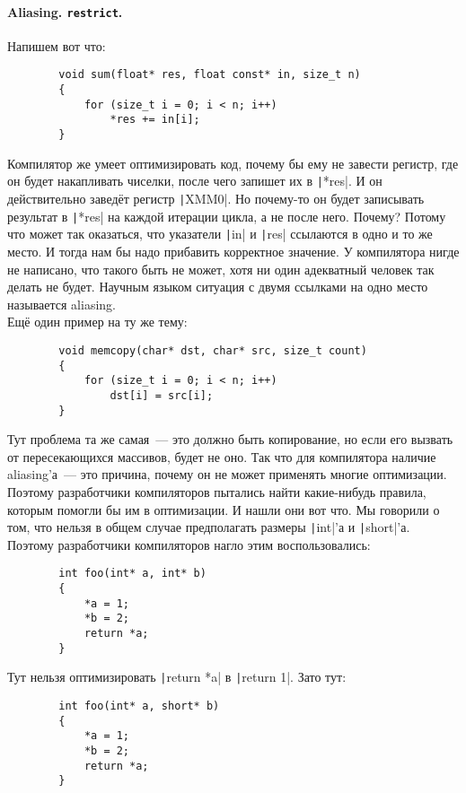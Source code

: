 \documentclass{article}
\begin{document}
    \paragraph{Aliasing. \texttt{restrict}.}
    Напишем вот что:
    \begin{verbatim}
        void sum(float* res, float const* in, size_t n)
        {
            for (size_t i = 0; i < n; i++)
                *res += in[i];
        }
    \end{verbatim}
    Компилятор же умеет оптимизировать код, почему бы ему не завести регистр, где он будет накапливать чиселки, после чего запишет их в \texttt|*res|. И он действительно заведёт регистр \texttt|XMM0|. Но почему-то он будет записывать результат в \texttt|*res| на каждой итерации цикла, а не после него. Почему? Потому что может так оказаться, что указатели \texttt|in| и \texttt|res| ссылаются в одно и то же место. И тогда нам бы надо прибавить корректное значение. У компилятора нигде не написано, что такого быть не может, хотя ни один адекватный человек так делать не будет. Научным языком ситуация с двумя ссылками на одно место называется aliasing.\\
    Ещё один пример на ту же тему:
    \begin{verbatim}
        void memcopy(char* dst, char* src, size_t count)
        {
            for (size_t i = 0; i < n; i++)
                dst[i] = src[i];
        }
    \end{verbatim}
    Тут проблема та же самая~--- это должно быть копирование, но если его вызвать от пересекающихся массивов, будет не оно. Так что для компилятора наличие aliasing'а~--- это причина, почему он не может применять многие оптимизации. Поэтому разработчики компиляторов пытались найти какие-нибудь правила, которым помогли бы им в оптимизации. И нашли они вот что. Мы говорили о том, что нельзя в общем случае предполагать размеры \texttt|int|'а и \texttt|short|'а. Поэтому разработчики компиляторов нагло этим воспользовались:
    \begin{verbatim}
        int foo(int* a, int* b)
        {
            *a = 1;
            *b = 2;
            return *a;
        }
    \end{verbatim}
    Тут нельзя оптимизировать \texttt|return *a| в \texttt|return 1|. Зато тут:
    \begin{verbatim}
        int foo(int* a, short* b)
        {
            *a = 1;
            *b = 2;
            return *a;
        }
    \end{verbatim}
\end{document}

